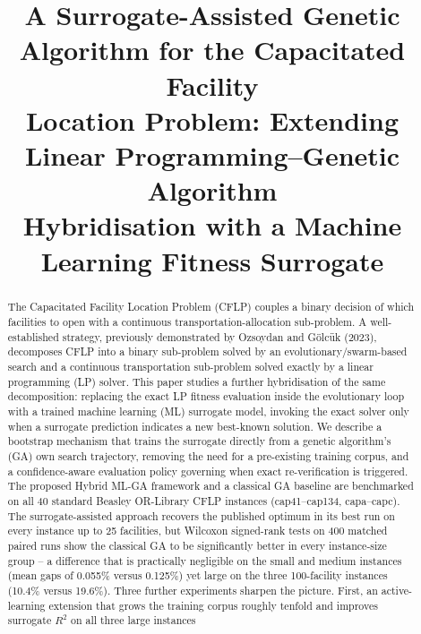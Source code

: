 \documentclass[conference]{IEEEtran}
\begin{document}
\title{A Surrogate-Assisted Genetic Algorithm for the Capacitated Facility\\
Location Problem: Extending Linear Programming--Genetic Algorithm\\
Hybridisation with a Machine Learning Fitness Surrogate}

\author{
}

\maketitle

\begin{abstract}
The Capacitated Facility Location Problem (CFLP) couples a binary decision of
which facilities to open with a continuous transportation-allocation
sub-problem. A well-established strategy, previously demonstrated by Ozsoydan
and G\"{o}lc\"{u}k (2023), decomposes CFLP into a binary sub-problem solved by
an evolutionary/swarm-based search and a continuous transportation sub-problem
solved exactly by a linear programming (LP) solver. This paper studies a
further hybridisation of the same decomposition: replacing the exact LP
fitness evaluation inside the evolutionary loop with a trained machine
learning (ML) surrogate model, invoking the exact solver only when a
surrogate prediction indicates a new best-known solution. We describe a
bootstrap mechanism that trains the surrogate directly from a genetic
algorithm's (GA) own search trajectory, removing the need for a pre-existing
training corpus, and a confidence-aware evaluation policy governing when
exact re-verification is triggered. The proposed Hybrid ML-GA framework and a
classical GA baseline are benchmarked on all 40 standard Beasley OR-Library
CFLP instances (cap41--cap134, capa--capc). The surrogate-assisted approach
recovers the published optimum in its best run on every instance up to 25
facilities, but Wilcoxon signed-rank tests on 400 matched paired runs show the
classical GA to be significantly better in every instance-size group -- a
difference that is practically negligible on the small and medium instances
(mean gaps of 0.055\% versus 0.125\%) yet large on the three 100-facility
instances (10.4\% versus 19.6\%). Three further experiments sharpen the
picture. First, an active-learning extension that grows the training corpus
roughly tenfold and improves surrogate $R^2$ on all three large instances

\end{abstract}
\end{document}

